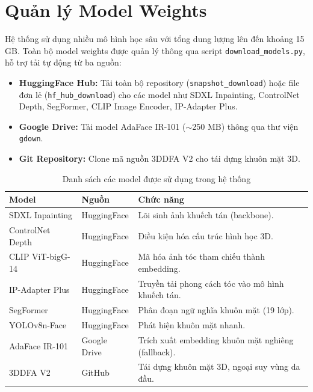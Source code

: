 \documentclass[../main.tex]{subfiles}
\begin{document}
\section{Quản lý Model Weights}

Hệ thống sử dụng nhiều mô hình học sâu với tổng dung lượng lên đến khoảng 15 GB. Toàn bộ model weights được quản lý thông qua script \texttt{download\_models.py}, hỗ trợ tải tự động từ ba nguồn:

\begin{itemize}
    \item \textbf{HuggingFace Hub:} Tải toàn bộ repository (\texttt{snapshot\_download}) hoặc file đơn lẻ (\texttt{hf\_hub\_download}) cho các model như SDXL Inpainting, ControlNet Depth, SegFormer, CLIP Image Encoder, IP-Adapter Plus.
    \item \textbf{Google Drive:} Tải model AdaFace IR-101 ($\sim$250 MB) thông qua thư viện \texttt{gdown}.
    \item \textbf{Git Repository:} Clone mã nguồn 3DDFA V2 cho tái dựng khuôn mặt 3D.
\end{itemize}

\begin{table}[H]
    \centering
    \caption{Danh sách các model được sử dụng trong hệ thống}
    \label{tab:model-list}
    \begin{tabularx}{\textwidth}{|>{\raggedright\arraybackslash}p{4cm}|>{\raggedright\arraybackslash}p{3cm}|X|}
        \hline
        \textbf{Model} & \textbf{Nguồn} & \textbf{Chức năng} \\
        \hline
        SDXL Inpainting & HuggingFace & Lõi sinh ảnh khuếch tán (backbone). \\
        \hline
        ControlNet Depth & HuggingFace & Điều kiện hóa cấu trúc hình học 3D. \\
        \hline
        CLIP ViT-bigG-14 & HuggingFace & Mã hóa ảnh tóc tham chiếu thành embedding. \\
        \hline
        IP-Adapter Plus & HuggingFace & Truyền tải phong cách tóc vào mô hình khuếch tán. \\
        \hline
        SegFormer & HuggingFace & Phân đoạn ngữ nghĩa khuôn mặt (19 lớp). \\
        \hline
        YOLOv8n-Face & HuggingFace & Phát hiện khuôn mặt nhanh. \\
        \hline
        AdaFace IR-101 & Google Drive & Trích xuất embedding khuôn mặt nghiêng (fallback). \\
        \hline
        3DDFA V2 & GitHub & Tái dựng khuôn mặt 3D, ngoại suy vùng da đầu. \\
        \hline
    \end{tabularx}
\end{table}
\end{document}

